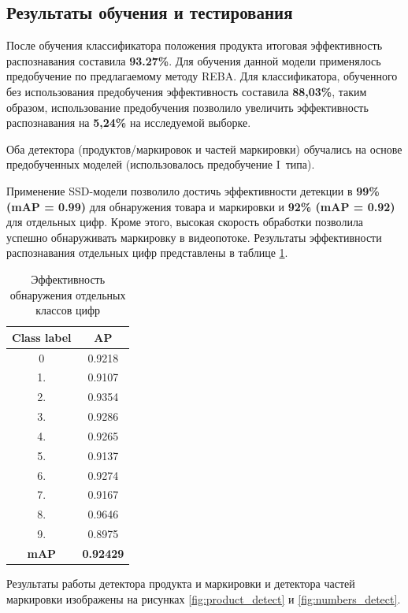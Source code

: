 \subsection{Результаты обучения и тестирования} 
После обучения классификатора положения продукта итоговая эффективность распознавания составила \textbf{93.27\%}. Для обучения данной модели применялось предобучение по предлагаемому методу REBA.
Для классификатора, обученного без использования предобучения эффективность составила \textbf{88,03\%}, таким образом, использование предобучения позволило увеличить эффективность распознавания на \textbf{5,24\%} на исследуемой выборке.

Оба детектора (продуктов/маркировок и частей маркировки) обучались на основе предобученных моделей (использовалось предобучение I~типа).

Применение SSD-модели позволило достичь эффективности детекции в \textbf{99\% (mAP = 0.99)} для обнаружения товара и маркировки и \textbf{92\% (mAP = 0.92)} для отдельных цифр. Кроме этого, высокая скорость обработки позволила успешно обнаруживать маркировку в видеопотоке. Результаты эффективности распознавания отдельных цифр представлены в таблице \ref{tab:efficiency_detector1}.  

\begin{table}[h]
\caption{Эффективность обнаружения отдельных классов цифр}
\centering
\begin{tabular}{ | c | c |  }
\hline
Class label & AP \\ \hline
0 & 0.9218\\
1. & 0.9107\\
2. & 0.9354\\
3. & 0.9286\\
4. & 0.9265\\
5. & 0.9137\\
6. & 0.9274\\
7. & 0.9167\\
8. & 0.9646\\
9. & 0.8975\\
\hline
\textbf{mAP} & \textbf{0.92429}\\
\hline
\end{tabular}
\label{tab:efficiency_detector1}
\end{table}

Результаты работы детектора продукта и маркировки и детектора частей маркировки изображены на рисунках \ref{fig:product_detect}  и \ref{fig:numbers_detect}.

